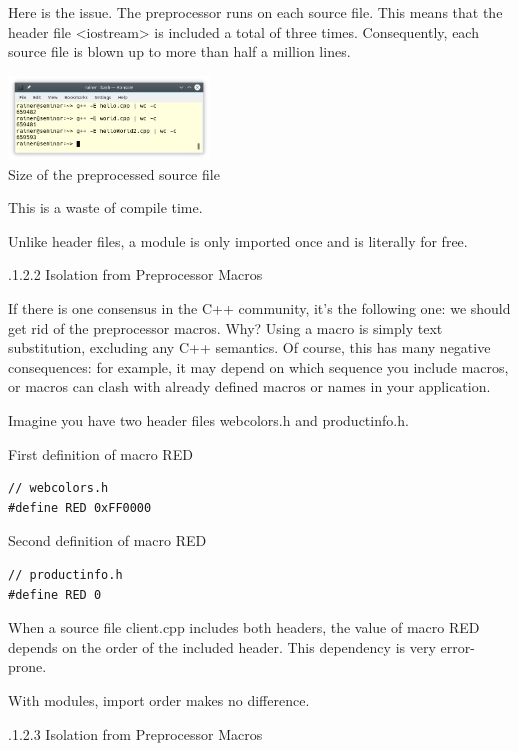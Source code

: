 Here is the issue. The preprocessor runs on each source file. This means that the header file <iostream> is included a total of three times. Consequently, each source file is blown up to more than half a million lines.

\begin{center}
\includegraphics[width=0.4\textwidth]{content/3/chapter4/images/15.png}\\
Size of the preprocessed source file
\end{center}

This is a waste of compile time.

Unlike header files, a module is only imported once and is literally for free.

.1.2.2\hspace{0.2cm} Isolation from Preprocessor Macros

If there is one consensus in the C++ community, it’s the following one: we should get rid of the preprocessor macros. Why? Using a macro is simply text substitution, excluding any C++ semantics. Of course, this has many negative consequences: for example, it may depend on which sequence you include macros, or macros can clash with already defined macros or names in your application.

Imagine you have two header files webcolors.h and productinfo.h.

\noindent
First definition of macro RED
\begin{lstlisting}[style=styleCXX]
// webcolors.h
#define RED 0xFF0000
\end{lstlisting}

\noindent
Second definition of macro RED
\begin{lstlisting}[style=styleCXX]
// productinfo.h
#define RED 0
\end{lstlisting}

When a source file client.cpp includes both headers, the value of macro RED depends on the order of the included header. This dependency is very error-prone.

With modules, import order makes no difference.

.1.2.3\hspace{0.2cm} Isolation from Preprocessor Macros

